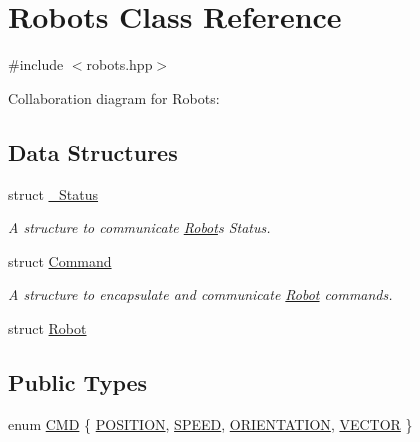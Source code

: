 \hypertarget{class_robots}{}\section{Robots Class Reference}
\label{class_robots}


{\ttfamily \#include $<$robots.\+hpp$>$}



Collaboration diagram for Robots\+:
\subsection*{Data Structures}
\begin{DoxyCompactItemize}
\item 
struct \hyperlink{struct_robots_1_1___status}{\+\_\+\+Status}
\begin{DoxyCompactList}\small\item\em A structure to communicate \hyperlink{struct_robots_1_1_robot}{Robot}\textquotesingle{}s Status. \end{DoxyCompactList}\item 
struct \hyperlink{struct_robots_1_1_command}{Command}
\begin{DoxyCompactList}\small\item\em A structure to encapsulate and communicate \hyperlink{struct_robots_1_1_robot}{Robot} commands. \end{DoxyCompactList}\item 
struct \hyperlink{struct_robots_1_1_robot}{Robot}
\end{DoxyCompactItemize}
\subsection*{Public Types}
\begin{DoxyCompactItemize}
\item 
enum \hyperlink{class_robots_adcc7ae7fbb9bdc57a26ee70fa1ae88e5}{C\+MD} \{ \hyperlink{class_robots_adcc7ae7fbb9bdc57a26ee70fa1ae88e5a6beca7349672ec17b6a0a7b04f4f1615}{P\+O\+S\+I\+T\+I\+ON}, 
\hyperlink{class_robots_adcc7ae7fbb9bdc57a26ee70fa1ae88e5a834a07faebe2dff9d8d12e2aa9ec5a09}{S\+P\+E\+ED}, 
\hyperlink{class_robots_adcc7ae7fbb9bdc57a26ee70fa1ae88e5a4062dd5b3d7d62bbdb60c47a678d0430}{O\+R\+I\+E\+N\+T\+A\+T\+I\+ON}, 
\hyperlink{class_robots_adcc7ae7fbb9bdc57a26ee70fa1ae88e5ae8464c5548b456a68b657528ede6cd40}{V\+E\+C\+T\+OR}
 \}
\end{DoxyCompactItemize}
